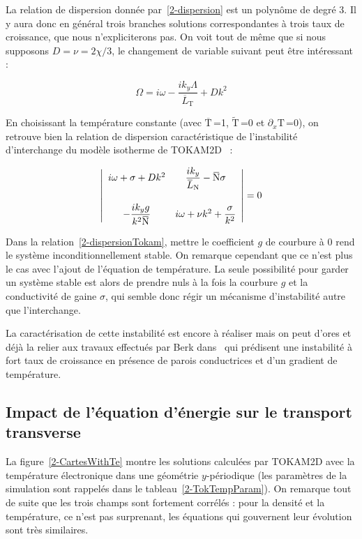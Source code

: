 \begin{refsection}
 La relation de dispersion donnée
 par~\eqref{2-dispersion} est un polynôme de degré 3. Il y aura donc en général
 trois branches solutions correspondantes à trois taux de croissance, que nous
 n'expliciterons pas. On voit tout de même que si nous supposons
 $D=\nu=2\chi/3$, le changement de variable suivant peut être intéressant :
 
  \begin{equation}
 \Omega=i\omega
-\dfrac{ik_y\Lambda}{\overbar{L}_{\text{T}}}+Dk^2
 \end{equation}
 
 En choisissant la température
 constante (avec $\overbar{\text{T}}\,$=1, $\widetilde{\text{T}}\,$=0 et $\partial_x\text{T}\,$=0), on retrouve bien la relation de dispersion caractéristique de l'instabilité
 d'interchange du modèle isotherme de TOKAM2D~\parencite{SarazinPhD} :
 
\begin{equation}
\label{2-dispersionTokam}
\left|\begin{array}{ccc}
i\omega+\sigma+Dk^2
&
\dfrac{ik_y}{\overbar{L}_\text{N}}-\overbar{\text{N}}\sigma
\\[2em]
-\dfrac{ik_yg}{k^2\overbar{\text{N}}} 
& 
i\omega+\nu k^2+\dfrac{\sigma}{k^2}
\end{array}\right|=0\\[3ex]
\end{equation}

Dans la relation~\eqref{2-dispersionTokam}, mettre le coefficient $g$ de
courbure à 0 rend le système inconditionnellement stable. On remarque cependant
que ce n'est plus le cas avec l'ajout de l'équation de température. La seule
possibilité pour garder un système stable est alors de prendre nuls à la fois
la courbure $g$ et la conductivité de gaine $\sigma$, qui semble donc régir un
mécanisme d'instabilité autre que l'interchange.

La caractérisation de cette
instabilité est encore à réaliser mais on peut d'ores et déjà la
relier aux travaux effectués par Berk dans~\parencite{Berk} qui prédisent une
instabilité à fort taux de croissance en présence de parois conductrices et d'un gradient
de température.

\subsection{Impact de l'équation d'énergie sur le transport transverse}

La figure~\ref{2-CartesWithTe} montre les solutions calculées par TOKAM2D avec
la température électronique dans une géométrie $y$-périodique (les paramètres
de la simulation sont rappelés dans le tableau~\ref{2-TokTempParam}).
On remarque tout de suite que les trois champs sont fortement corrélés : pour la densité et
la température, ce n'est pas surprenant, les équations qui gouvernent leur
évolution sont très similaires. 


\end{refsection}
